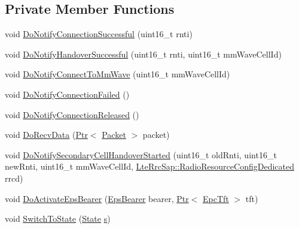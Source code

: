 \subsection*{Private Member Functions}
\begin{DoxyCompactItemize}
\item 
void \hyperlink{classns3_1_1EpcUeNas_a524ae20735b7e1ac292df745f805980f}{Do\+Notify\+Connection\+Successful} (uint16\+\_\+t rnti)
\item 
void \hyperlink{classns3_1_1EpcUeNas_a1011b6a9817fc6e615450b35d75cec8c}{Do\+Notify\+Handover\+Successful} (uint16\+\_\+t rnti, uint16\+\_\+t mm\+Wave\+Cell\+Id)
\item 
void \hyperlink{classns3_1_1EpcUeNas_a1abaa8bf5b9db152f7ae0a20561b7c0f}{Do\+Notify\+Connect\+To\+Mm\+Wave} (uint16\+\_\+t mm\+Wave\+Cell\+Id)
\item 
void \hyperlink{classns3_1_1EpcUeNas_a9005e1ba1e8bcb952aa14673c59f7408}{Do\+Notify\+Connection\+Failed} ()
\item 
void \hyperlink{classns3_1_1EpcUeNas_aada1dcf7061f77a4f337f56b576e3a7d}{Do\+Notify\+Connection\+Released} ()
\item 
void \hyperlink{classns3_1_1EpcUeNas_ae7c82e648fa8a7b6dceed9a9f41ed10e}{Do\+Recv\+Data} (\hyperlink{classns3_1_1Ptr}{Ptr}$<$ \hyperlink{classns3_1_1Packet}{Packet} $>$ packet)
\item 
void \hyperlink{classns3_1_1EpcUeNas_a4f9482109ae787194f49261ef3de5d98}{Do\+Notify\+Secondary\+Cell\+Handover\+Started} (uint16\+\_\+t old\+Rnti, uint16\+\_\+t new\+Rnti, uint16\+\_\+t mm\+Wave\+Cell\+Id, \hyperlink{structns3_1_1LteRrcSap_1_1RadioResourceConfigDedicated}{Lte\+Rrc\+Sap\+::\+Radio\+Resource\+Config\+Dedicated} rrcd)
\item 
void \hyperlink{classns3_1_1EpcUeNas_a7a2c493d367fd7d526e8a0168438116b}{Do\+Activate\+Eps\+Bearer} (\hyperlink{structns3_1_1EpsBearer}{Eps\+Bearer} bearer, \hyperlink{classns3_1_1Ptr}{Ptr}$<$ \hyperlink{classns3_1_1EpcTft}{Epc\+Tft} $>$ tft)
\item 
void \hyperlink{classns3_1_1EpcUeNas_a00835b29963b7eff0c4a8f1bc82a91fe}{Switch\+To\+State} (\hyperlink{classns3_1_1EpcUeNas_a8047255fecfac11c9e1abe6f13d527dc}{State} \hyperlink{generate__test__data__lte__sinr_8m_ad83eeb3a142285d1243a08c6b7026df8}{s})
\end{DoxyCompactItemize}
